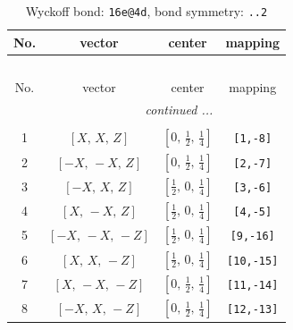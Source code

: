 \documentclass[fleqn,8pt]{jsarticle}
\begin{document}
\begin{longtable}{cccc}
\caption{Wyckoff bond: {\tt 16e@4d}, bond symmetry: {\tt ..2}}
 \\
 \hline \hline
No. & vector & center & mapping \\ \hline \endfirsthead

\multicolumn{3}{l}{\tablename\ \thetable{}} \\
 \hline \hline
No. & vector & center & mapping \\ \hline \endhead

 \hline \hline
\multicolumn{3}{r}{\footnotesize\it continued ...} \\ \endfoot

 \hline \hline
\multicolumn{3}{r}{} \\ \endlastfoot

1 & $\left[ X,\, X,\, Z \right]$ & $\left[ 0,\, \frac{1}{2},\, \frac{1}{4} \right]$ & {\tt [1,-8]} \\ \hline
2 & $\left[ - X,\, - X,\, Z \right]$ & $\left[ 0,\, \frac{1}{2},\, \frac{1}{4} \right]$ & {\tt [2,-7]} \\ \hline
3 & $\left[ - X,\, X,\, Z \right]$ & $\left[ \frac{1}{2},\, 0,\, \frac{1}{4} \right]$ & {\tt [3,-6]} \\ \hline
4 & $\left[ X,\, - X,\, Z \right]$ & $\left[ \frac{1}{2},\, 0,\, \frac{1}{4} \right]$ & {\tt [4,-5]} \\ \hline
5 & $\left[ - X,\, - X,\, - Z \right]$ & $\left[ \frac{1}{2},\, 0,\, \frac{1}{4} \right]$ & {\tt [9,-16]} \\ \hline
6 & $\left[ X,\, X,\, - Z \right]$ & $\left[ \frac{1}{2},\, 0,\, \frac{1}{4} \right]$ & {\tt [10,-15]} \\ \hline
7 & $\left[ X,\, - X,\, - Z \right]$ & $\left[ 0,\, \frac{1}{2},\, \frac{1}{4} \right]$ & {\tt [11,-14]} \\ \hline
8 & $\left[ - X,\, X,\, - Z \right]$ & $\left[ 0,\, \frac{1}{2},\, \frac{1}{4} \right]$ & {\tt [12,-13]} \\
\end{longtable}
\renewcommand{\arraystretch}{1.2}
\end{document}
